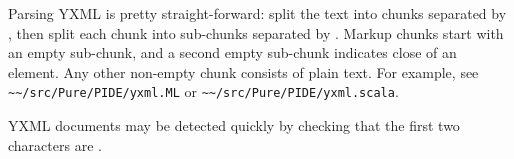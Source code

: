 \begin{isabellebody}
\begin{isamarkuptext}
\begin{enumerate}
  \end{enumerate}

  Parsing YXML is pretty straight-forward: split the text into chunks
  separated by , then split each chunk into
  sub-chunks separated by .  Markup chunks start
  with an empty sub-chunk, and a second empty sub-chunk indicates
  close of an element.  Any other non-empty chunk consists of plain
  text.  For example, see \verb|~~/src/Pure/PIDE/yxml.ML| or
  \verb|~~/src/Pure/PIDE/yxml.scala|.

  YXML documents may be detected quickly by checking that the first
  two characters are .%
\end{isamarkuptext}%
\isamarkuptrue%
%
\isadelimtheory
%
\endisadelimtheory
%
\isatagtheory
{}\isamarkupfalse%
%
\endisatagtheory
{\isafoldtheory}%
%
\isadelimtheory
%
\endisadelimtheory
\end{isabellebody}%
